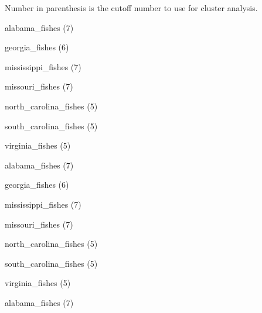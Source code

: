 \documentclass[11pt]{article}
\begin{document}
\thispagestyle{empty}

Number in parenthesis is the cutoff number to use for cluster analysis.

\begin{multicols}{2}
	\Large
alabama\_fishes (7)

\vspace{1\baselineskip}

georgia\_fishes (6)

\vspace{1\baselineskip}

mississippi\_fishes (7)

\vspace{1\baselineskip}

missouri\_fishes (7)

\vspace{1\baselineskip}

north\_carolina\_fishes (5)

\vspace{1\baselineskip}

south\_carolina\_fishes (5)

\vspace{1\baselineskip}

virginia\_fishes (5)

\vspace{1\baselineskip}

alabama\_fishes (7)

\vspace{1\baselineskip}

georgia\_fishes (6)

\vspace{1\baselineskip}

mississippi\_fishes (7)

\vspace{1\baselineskip}

missouri\_fishes (7)

\vspace{1\baselineskip}

north\_carolina\_fishes (5)

\vspace{1\baselineskip}

south\_carolina\_fishes (5)

\vspace{1\baselineskip}

virginia\_fishes (5)

\columnbreak

alabama\_fishes (7)


\end{multicols}
\end{document}
